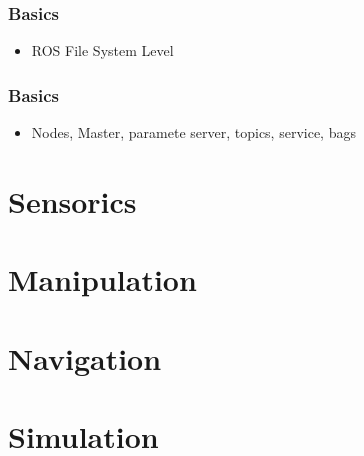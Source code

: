 \documentclass[t]{beamer}
\begin{document}
\begin{frame}
\frametitle{Basics}
\begin{itemize}
  \item ROS File System Level
\end{itemize}
\end{frame}

\begin{frame}
\frametitle{Basics}
\begin{itemize}
  \item Nodes, Master, paramete server, topics, service, bags
\end{itemize}
\end{frame}

\section{Sensorics}
\section{Manipulation}
\section{Navigation}
\section{Simulation}
\end{document}
